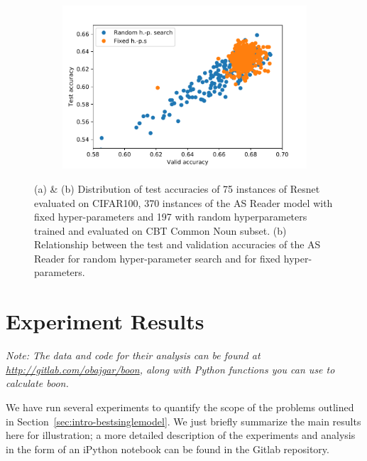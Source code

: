 \documentclass{article}
\newcommand{\tboon}{\gls{boon}\xspace}
\begin{document}
\begin{figure}[t]
\begin{subfigure}[b]{0.31\textwidth}
            \includegraphics[width=\textwidth]{figures/cbt_valid_test.pdf}
            \label{fig:val-test-corr}
           \caption[]{}
        \end{subfigure}
        \caption[ NA ]{
        (a) \& (b) Distribution of test accuracies of 75 instances of Resnet evaluated on CIFAR100, 370 instances of the AS Reader model with fixed hyper-parameters and 197 with random hyperparameters trained and evaluated on CBT Common Noun subset. (b) Relationship between the test and validation accuracies of the AS Reader for random hyper-parameter search and for fixed hyper-parameters.}
        \label{fig:asr-test-accuracies}
\end{figure}



\section{Experiment Results}
\label{sec:experiments}




{\it Note: The data and code for their analysis can be found at \url{http://gitlab.com/obajgar/boon}, along with Python functions you can use to calculate \tboon.}

We have run several experiments to quantify the scope of the problems outlined in Section~\ref{sec:intro-bestsinglemodel}. We just briefly summarize the main results here for illustration; a more detailed description of the experiments and analysis in the form of an iPython notebook can be found in the Gitlab repository.
\end{document}
